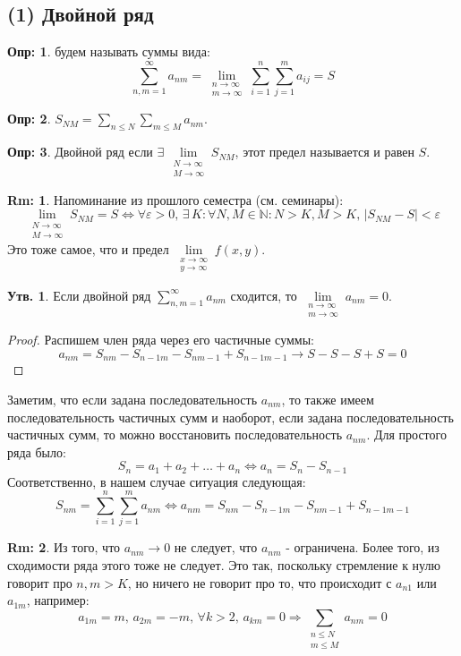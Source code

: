 \documentclass[12pt]{article}
\newcommand{\MN}{\mathbb{N}}
\newcommand{\VE}{\varepsilon}
\theoremstyle{definition}
\newtheorem{defn}{Опр:}
\newtheorem{rem}{Rm:}
\newtheorem{prop}{Утв.}
\newcommand{\ddsum}[2]{\displaystyle\sum\limits_{#1}^{#2}}
\begin{document}
\subsection*{(1) Двойной ряд}
\begin{defn}
	 будем называть суммы вида:
	$$
		\ddsum{n,m = 1}{\infty}a_{nm} = \lim\limits_{\substack{n \to \infty\\ m \to \infty}}\ddsum{i = 1}{n}\ddsum{j = 1}{m}a_{ij} = S
	$$
\end{defn}
\begin{defn}
	 $S_{NM} = \displaystyle \sum\limits_{n \leq N}\sum\limits_{m \leq M} a_{nm}$. 
\end{defn}
\begin{defn}
	Двойной ряд  если $\exists \, \lim\limits_{\substack{N \to \infty\\ M \to \infty}} S_{NM}$, этот предел называется  и равен $S$.
\end{defn}

\begin{rem}
	Напоминание из прошлого семестра (см. семинары):
	$$
		\lim\limits_{\substack{N \to \infty\\ M \to \infty}} S_{NM} = S \Leftrightarrow \forall \VE > 0, \, \exists \, K \colon \forall N,M \in \MN \colon N > K, M > K, \, |S_{NM} - S| < \VE
	$$
	Это тоже самое, что и предел $\lim\limits_{\substack{x \to \infty\\ y \to \infty}}f(x,y)$.
\end{rem}

\begin{prop}
	Если двойной ряд $\displaystyle\sum\limits_{n,m = 1}^{\infty}a_{nm}$ сходится, то $\lim\limits_{\substack{n \to \infty\\ m \to \infty}}a_{nm} = 0$.
\end{prop}
\begin{proof}
	Распишем член ряда через его частичные суммы:
	$$
		a_{nm} = S_{nm} - S_{n-1 m} - S_{n m - 1} + S_{n -1 m - 1 }  \to S - S - S + S = 0
	$$
\end{proof}

Заметим, что если задана последовательность $a_{nm}$, то также имеем последовательность частичных сумм и наоборот, если задана последовательность частичных сумм, то можно восстановить последовательность $a_{nm}$. Для простого ряда было:
$$
	S_n = a_1 + a_2 + \dotsc + a_n \Leftrightarrow a_n = S_n - S_{n-1}
$$
Соответственно, в нашем случае ситуация следующая:
$$
	S_{nm} = \ddsum{i = 1}{n}\ddsum{j = 1}{m}a_{nm} \Leftrightarrow a_{nm} = S_{nm} - S_{n-1m} - S_{nm-1} + S_{n-1m-1}
$$
\begin{rem}
	Из того, что $a_{nm} \to 0$ не следует, что $a_{nm}$ - ограничена. Более того, из сходимости ряда этого тоже не следует. Это так, поскольку стремление к нулю говорит про $n,m > K$, но ничего не говорит про то, что происходит с $a_{n1}$ или $a_{1m}$, например:
	$$
		a_{1m} = m, \, a_{2m} = -m, \, \forall k > 2, \, a_{km} = 0 \Rightarrow \sum\limits_{\substack{n \leq N\\ m \leq M}}a_{nm} = 0
	$$
\end{rem}
\end{document}
